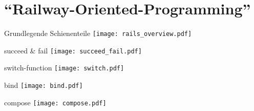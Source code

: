 \documentclass[compress]{beamer}
\begin{document}
\section{"`Railway-Oriented-Programming"'}
\begin{frame}{Grundlegende Schienenteile}
  \texttt{[image: rails\_overview.pdf]}
\end{frame}
\begin{frame}{succeed \& fail}
  \texttt{[image: succeed\_fail.pdf]}
\end{frame}
\begin{frame}{switch-function}
  \texttt{[image: switch.pdf]}
\end{frame}
\begin{frame}{bind}
  \texttt{[image: bind.pdf]}
\end{frame}
\begin{frame}{compose}
  \texttt{[image: compose.pdf]}
\end{frame}
\end{document}
